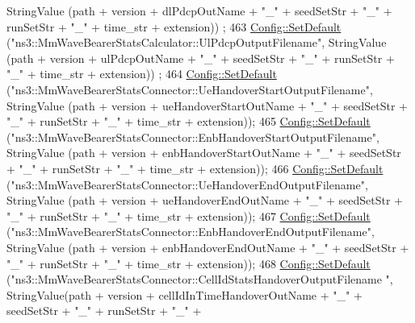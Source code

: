 \begin{DoxyCode}
{      StringValue       (path + version + dlPdcpOutName + \textcolor{stringliteral}{"\_"} + seedSetStr + \textcolor{stringliteral}{"\_"} + runSetStr + \textcolor{stringliteral}{"\_"} + time\_str + extension))
      ;
463   \hyperlink{group__config_ga2e7882df849d8ba4aaad31c934c40c06}{Config::SetDefault} (\textcolor{stringliteral}{"ns3::MmWaveBearerStatsCalculator::UlPdcpOutputFilename"}, 
      StringValue       (path + version + ulPdcpOutName + \textcolor{stringliteral}{"\_"} + seedSetStr + \textcolor{stringliteral}{"\_"} + runSetStr + \textcolor{stringliteral}{"\_"} + time\_str + extension))
      ;
464   \hyperlink{group__config_ga2e7882df849d8ba4aaad31c934c40c06}{Config::SetDefault} (\textcolor{stringliteral}{"ns3::MmWaveBearerStatsConnector::UeHandoverStartOutputFilename"}, 
      StringValue    (path + version +  ueHandoverStartOutName + \textcolor{stringliteral}{"\_"} + seedSetStr + \textcolor{stringliteral}{"\_"} + runSetStr + \textcolor{stringliteral}{"\_"} + 
      time\_str + extension));
465   \hyperlink{group__config_ga2e7882df849d8ba4aaad31c934c40c06}{Config::SetDefault} (\textcolor{stringliteral}{"ns3::MmWaveBearerStatsConnector::EnbHandoverStartOutputFilename"}, 
      StringValue   (path + version + enbHandoverStartOutName + \textcolor{stringliteral}{"\_"} + seedSetStr + \textcolor{stringliteral}{"\_"} + runSetStr + \textcolor{stringliteral}{"\_"} + 
      time\_str + extension));
466   \hyperlink{group__config_ga2e7882df849d8ba4aaad31c934c40c06}{Config::SetDefault} (\textcolor{stringliteral}{"ns3::MmWaveBearerStatsConnector::UeHandoverEndOutputFilename"}, 
      StringValue    (path + version +  ueHandoverEndOutName + \textcolor{stringliteral}{"\_"} + seedSetStr + \textcolor{stringliteral}{"\_"} + runSetStr + \textcolor{stringliteral}{"\_"} + time\_str + 
      extension));
467   \hyperlink{group__config_ga2e7882df849d8ba4aaad31c934c40c06}{Config::SetDefault} (\textcolor{stringliteral}{"ns3::MmWaveBearerStatsConnector::EnbHandoverEndOutputFilename"}, 
      StringValue   (path + version + enbHandoverEndOutName + \textcolor{stringliteral}{"\_"} + seedSetStr + \textcolor{stringliteral}{"\_"} + runSetStr + \textcolor{stringliteral}{"\_"} + time\_str + 
      extension));
468   \hyperlink{group__config_ga2e7882df849d8ba4aaad31c934c40c06}{Config::SetDefault} (\textcolor{stringliteral}{"ns3::MmWaveBearerStatsConnector::CellIdStatsHandoverOutputFilename
      "}, StringValue(path + version + cellIdInTimeHandoverOutName + \textcolor{stringliteral}{"\_"} + seedSetStr + \textcolor{stringliteral}{"\_"} + runSetStr + \textcolor{stringliteral}{"\_"} + 
}
\end{DoxyCode}
